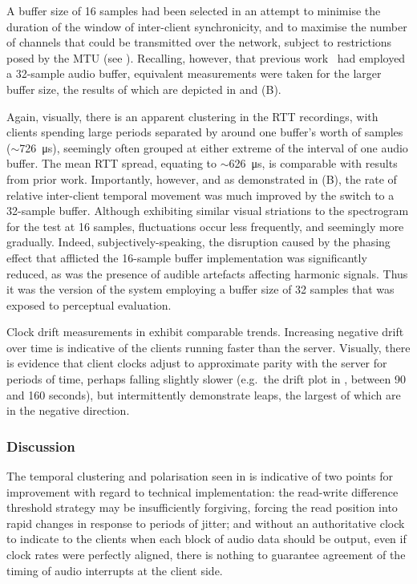 A buffer size of 16 samples had been selected in an attempt to minimise the
duration of the window of inter-client synchronicity, and to maximise the
number of channels that could be transmitted over the network, subject to
restrictions posed by the MTU (see
).
Recalling, however, that previous
work~\citep{rushton_microcontroller-based_2023}
had employed a 32-sample audio buffer, equivalent measurements were taken for
the larger buffer size, the results of which are depicted in
 and (B).

Again, visually, there is an apparent clustering in the RTT recordings, with
clients spending large periods separated by around one buffer's worth of
samples ($\sim$\qty{726}{\us}), seemingly often grouped at either
extreme of the interval of one audio buffer.
The mean RTT spread, equating to $\sim$\qty{626}{\us}, is comparable with
results from prior work.
Importantly, however, and as demonstrated in (B), the
rate of relative inter-client temporal movement was much improved by the switch
to a 32-sample buffer.
Although exhibiting similar visual striations to the spectrogram for the test
at 16 samples, fluctuations occur less frequently, and seemingly more
gradually.
Indeed, subjectively-speaking, the disruption caused by the phasing effect
that afflicted the 16-sample buffer implementation was significantly reduced,
as was the presence of audible artefacts affecting harmonic signals.
Thus it was the version of the system employing a buffer size of 32 samples
that was exposed to perceptual evaluation.

Clock drift measurements in  exhibit
comparable trends.
Increasing negative drift over time is indicative of the clients running faster
than the server.
Visually, there is evidence that client clocks adjust to approximate parity
with the server for periods of time, perhaps falling slightly slower (e.g.\
the drift plot in , between 90 and 160 seconds), but
intermittently demonstrate leaps, the largest of which are in the negative
direction.

\subsubsection{Discussion}\label{subsubsec:discussion-tech}

The temporal clustering and polarisation seen in
 is indicative of two points for
improvement with regard to technical implementation:
the read-write difference threshold strategy may be insufficiently forgiving,
forcing the read position into rapid changes in response to periods of jitter;
and without an authoritative clock to indicate to the clients when each block of
audio data should be output, even if clock rates were perfectly aligned, there
is nothing to guarantee agreement of the timing of audio interrupts at the
client side.

